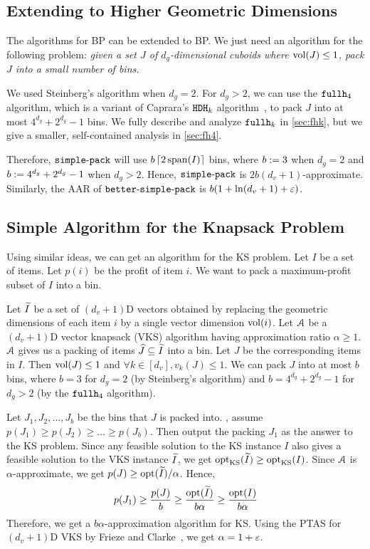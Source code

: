 \subsection{Extending to Higher Geometric Dimensions}

The algorithms for  BP can be extended to  BP.
We just need an algorithm for the following problem:
\textsl{given a set $J$ of $d_g$-dimensional cuboids where $\vol(J) \le 1$,
pack $J$ into a small number of bins.}

We used Steinberg's algorithm when $d_g = 2$.
For $d_g > 2$, we can use the $\fhk[4]$ algorithm, which is a variant of
Caprara's $\hdhk$ algorithm~\cite{caprara2008},
to pack $J$ into at most $4^{d_g} + 2^{d_g} - 1$ bins.
We fully describe and analyze $\fhk$ in \cref{sec:fhk},
but we give a smaller, self-contained analysis in \cref{sec:fh4}.

Therefore, $\simplePack$ will use
$b\ceil{2\Span(I)}$ bins, where $b \defeq 3$ when $d_g=2$
and $b \defeq 4^{d_g}+2^{d_g}-1$ when $d_g > 2$.
Hence, $\simplePack$ is $2b(d_v+1)$-approximate.
Similarly, the AAR of $\betterSimplePack$ is $b(1 + \ln(d_v + 1) + \eps)$.

\subsection{Simple Algorithm for the Knapsack Problem}

Using similar ideas, we can get an algorithm for the  KS problem.
Let $I$ be a set of  items. Let $p(i)$ be the profit of item $i$.
We want to pack a maximum-profit subset of $I$ into a bin.

Let $\Itild$ be a set of $(d_v+1)$D vectors obtained by replacing the
geometric dimensions of each item $i$ by a single vector dimension $\vol(i)$.
Let $\Acal$ be a $(d_v+1)$D vector knapsack (VKS) algorithm
having approximation ratio $\alpha \ge 1$.
$\Acal$ gives us a packing of items $\Jhat \subseteq \Itild$ into a bin.
Let $J$ be the corresponding items in $I$.
Then $\vol(J) \le 1$ and $\forall k \in [d_v], v_k(J) \le 1$.
We can pack $J$ into at most $b$ bins, where $b=3$ for $d_g=2$ (by Steinberg's algorithm)
and $b = 4^{d_g} + 2^{d_g} - 1$ for $d_g > 2$ (by the $\fhk[4]$ algorithm).

Let $J_1, J_2, \ldots, J_b$ be the bins that $J$ is packed into.
\WLoG, assume $p(J_1) \ge p(J_2) \ge \ldots \ge p(J_b)$. Then output the packing $J_1$
as the answer to the  KS problem.
Since any feasible solution to the  KS instance $I$ also gives a
feasible solution to the VKS instance $\Itild$, we get
$\opt_{\mathrm{KS}}(\Itild) \ge \opt_{\mathrm{KS}}(I)$.
Since $\Acal$ is $\alpha$-approximate, we get $p(J) \ge \opt(\Itild)/\alpha$. Hence,
\[ p(J_1) \ge \frac{p(J)}{b}
\ge \frac{\opt(\Itild)}{b\alpha}
\ge \frac{\opt(I)}{b\alpha} \]
Therefore, we get a $b\alpha$-approximation algorithm for  KS.
Using the PTAS for $(d_v+1)$D VKS by Frieze and Clarke~\cite{frieze1984approximation},
we get $\alpha = 1+\eps$.
